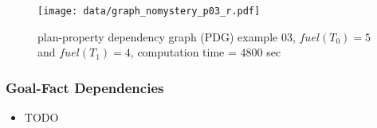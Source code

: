 \begin{figure}[ht]
\begin{center}
	\texttt{[image: data/graph\_nomystery\_p03\_r.pdf]}
\end{center}
\caption{plan-property dependency graph (PDG) example 03, $fuel(T_0) = 5$ and $fuel(T_1) = 4$, computation time = 4800 sec}
\end{figure}

\FloatBarrier
\subsubsection*{Goal-Fact Dependencies}

\begin{itemize}
	\item TODO
\end{itemize}



